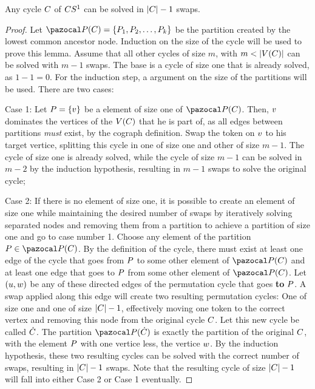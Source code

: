 \documentclass[msc,english,table,xcdraw]{ppgccufmg}
\begin{document}

\begin{lemma}
\label{lem:s_onecycle}
Any cycle $C$ of $CS^{1}$ can be solved in $|C| - 1$ swaps.
\end{lemma}

\begin{proof}
Let $\partitionFunc{\cycle} = \createSet{\partitionElem_{1}, \partitionElem_{2}, 
\ldots, \partitionElem_{k}}$ be the partition created by the lowest common
ancestor node.
Induction on the size of the cycle will be used to prove this lemma.
Assume that all other cycles of size $m$, with $m < |V(C)|$ 
can be solved with $m - 1$ swaps.
The base is a cycle of size one that is already solved, as $1-1 = 0$.
For the induction step, a argument on the size of the partitions will be used.
There are two cases:

Case 1: Let $P = \{v\}$ be a element of size 
one of $\partitionFunc{\cycle}$.
Then, $v$ dominates the vertices of the $V(C)$ that he 
is part of, as all edges between partitions \textit{must} exist, by the cograph
definition.
Swap the token on $v$ to his target vertice, splitting this cycle in
one of size one and other of size $m - 1$.
The cycle of size one is already solved, while the cycle of size $m - 1$ can
be solved in $m - 2$ by the induction hypothesis, resulting in $m - 1$ swaps
to solve the original cycle;

Case 2: If there is no element of size one, it is possible to create an element
of size one while maintaining the desired number of swaps by iteratively 
solving separated nodes and removing them from a partition to achieve a 
partition of size one and go to case number 1.
Choose any element of the partition $\partitionElem \in \partitionFunc{\cycle}$.
By the definition of the cycle, there must exist at least one edge of the cycle
that goes from $P$ to some other element of $\partitionFunc{\cycle}$
and at least one edge that goes to $P$ from some other element of
$\partitionFunc{\cycle}$.
Let $(u, w)$ be any of these directed edges of the permutation 
cycle that goes \textbf{to} $P$.
A swap applied along this edge will create two resulting permutation cycles: One 
of size one and one of size $|C| - 1$, effectively moving one token 
to the correct vertex and removing this node from the original cycle $C$.
Let this new cycle be called $\dot{C}$.
The partition $\partitionFunc{\sub{\cycle}}$ is exactly the partition of the 
original $C$, with the element $P$ with one vertice less,
the vertice $w$.
By the induction hypothesis, these two resulting cycles can be solved with
the correct number of swaps, resulting in $|C| - 1$ swaps.
Note that the resulting cycle of size $|C| - 1$ will fall into either
Case 2 or Case 1 eventually.
\end{proof}
\end{document}
